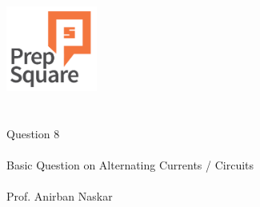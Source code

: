 \documentclass{beamer}
\begin{document}
\begin{center}
\ \\ \ \\
\includegraphics[width=30mm]{Logo-final.png} \\
\ \\ \ \\ 
{\huge Question 8 \\ \ \\ }
{\Large
Basic Question on Alternating Currents / Circuits
}
{\large \ \\ \ \\ Prof. Anirban Naskar }
\end{center}
\end{document}
